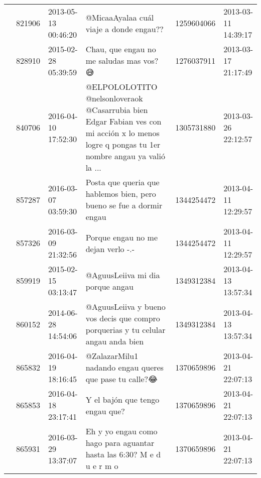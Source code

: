 \begin{tabular}{llllrl}
           & 821906  & 2013-05-13 00:46:20 &                                                                                                      @MicaaAyalaa cuál viaje a donde engau?? &  1259604066 & 2013-03-11 14:39:17 \\
           & 828910  & 2015-02-28 05:39:59 &                                                                                                     Chau, que engau no me saludas mas vos? 😅 &  1276037911 & 2013-03-17 21:17:49 \\
           & 840706  & 2016-04-10 17:52:30 &  @ELPOLOLOTITO @nelsonloveraok @Casarrubia bien Edgar Fabian ves con mi acción x lo menos logre q pongas tu 1er nombre angau ya valió la ... &  1305731880 & 2013-03-26 22:12:57 \\
           & 857287  & 2016-03-07 03:59:30 &                                                                         Posta que queria que hablemos bien, pero bueno se fue a dormir engau &  1344254472 & 2013-04-11 12:29:57 \\
           & 857326  & 2016-03-09 21:32:56 &                                                                                                           Porque engau no me dejan verlo -.- &  1344254472 & 2013-04-11 12:29:57 \\
           & 859919  & 2015-02-15 03:13:47 &                                                                                                             @AguusLeiiva mi dia porque angau &  1349312384 & 2013-04-13 13:57:34 \\
           & 860152  & 2014-06-28 14:54:06 &                                                            @AguusLeiiva y bueno vos decis que compro porquerias y tu celular angau anda bien &  1349312384 & 2013-04-13 13:57:34 \\
           & 865832  & 2016-04-19 18:16:45 &                                                                                       @ZalazarMilu1 nadando engau queres que pase tu calle?😂 &  1370659896 & 2013-04-21 22:07:13 \\
           & 865853  & 2016-04-18 23:17:41 &                                                                                                              Y el bajón que tengo engau que? &  1370659896 & 2013-04-21 22:07:13 \\
           & 865931  & 2016-03-29 13:37:07 &                                                                        Eh y yo engau como hago para aguantar hasta las 6:30? M e d u e r m o &  1370659896 & 2013-04-21 22:07:13 \\

\end{tabular}
